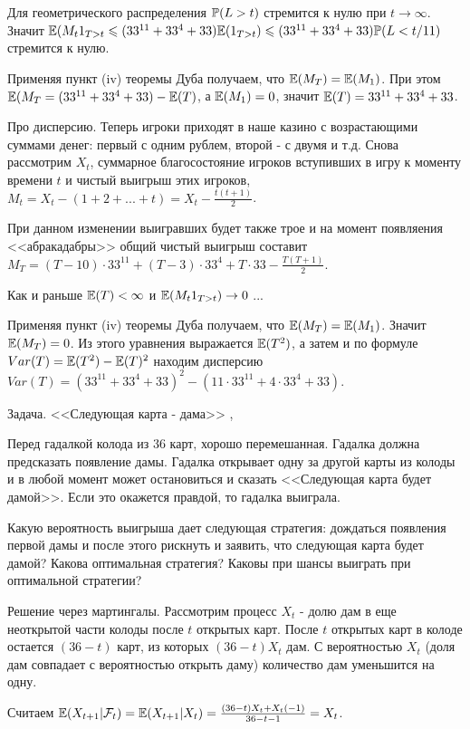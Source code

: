 {Для геометрического распределения $\P(L>t)$ стремится к нулю при $t\to\infty$. Значит $\E(M_{t}1_{T>t}\leq (33^{11}+33^{4}+33)\E(1_{T>t})\leq (33^{11}+33^{4}+33) \P(L<t/11)$ стремится к нулю.

Применяя пункт (iv) теоремы Дуба получаем, что $\E(M_{T})=\E(M_{1})$. При этом $\E(M_{T}=(33^{11}+33^{4}+33)-\E(T)$, а $\E(M_{1})=0$, значит $\E(T)=33^{11}+33^{4}+33$.

Про дисперсию. Теперь игроки приходят в наше казино с возрастающими суммами денег: первый с одним рублем, второй - с двумя и т.д. Снова рассмотрим $X_{t}$, суммарное благосостояние игроков вступивших в игру к моменту времени $t$ и чистый выигрыш этих игроков, $M_{t}=X_{t}-(1+2+...+t)=X_{t}-\frac{t(t+1)}{2}$.

При данном изменении выигравших будет также трое и на момент появляения <<абракадабры>> общий чистый выигрыш составит $M_{T}=(T-10)\cdot 33^{11}+(T-3)\cdot 33^{4}+T\cdot 33-\frac{T(T+1)}{2}$.

Как и раньше $\E(T)<\infty$ и $\E(M_{t}1_{T>t})\to 0$ ...

Применяя пункт (iv) теоремы Дуба получаем, что $\E(M_{T})=\E(M_{1})$. Значит $\E(M_{T})=0$. Из этого уравнения выражается $\E(T^{2})$, а затем и по формуле $Var(T)=\E(T^{2})-\E(T)^{2}$ находим дисперсию $Var(T)=(33^{11}+33^{4}+33)^{2}-(11\cdot 33^{11}+4\cdot 33^{4}+ 33)$.


Задача. <<Следующая карта - дама>> \cite{morters:m}, \cite{winkler:gpdp}

Перед гадалкой колода из 36 карт, хорошо перемешанная. Гадалка
должна предсказать появление дамы. Гадалка открывает
одну за другой карты из колоды и в любой момент может остановиться
и сказать <<Следующая карта будет дамой>>. Если это окажется правдой, то гадалка выиграла.

Какую вероятность выигрыша дает следующая стратегия: дождаться появления первой дамы и после этого рискнуть и заявить, что следующая карта будет дамой? Какова оптимальная стратегия? Каковы при шансы выиграть при оптимальной стратегии?

Решение через мартингалы. Рассмотрим процесс $X_{t}$ - долю дам в еще неоткрытой части колоды после $t$ открытых карт. После $t$ открытых карт в колоде остается $(36-t)$ карт, из которых $(36-t)X_{t}$ дам. С вероятностью $X_{t}$ (доля дам совпадает с вероятностью открыть даму) количество дам уменьшится на одну.

Считаем $\E(X_{t+1}|\mathcal{F}_{t})=\E(X_{t+1}|X_{t})=\frac{(36-t)X_{t}+X_{t}(-1)}{36-t-1}=X_{t}$.

}
